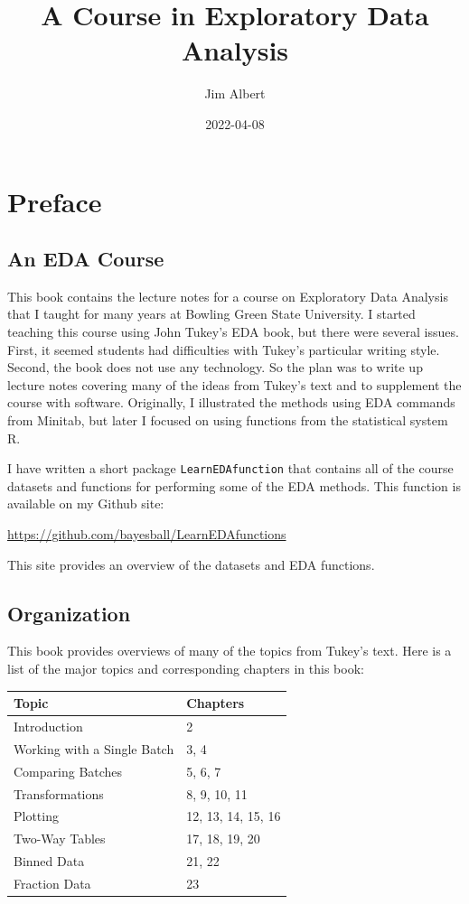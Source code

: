 \documentclass[
]{book}
\title{A Course in Exploratory Data Analysis}
\author{Jim Albert}
\date{2022-04-08}
\begin{document}
\maketitle

{
\setcounter{tocdepth}{1}
\tableofcontents
}
\hypertarget{preface}{%
\chapter{Preface}\label{preface}}

\hypertarget{an-eda-course}{%
\section{An EDA Course}\label{an-eda-course}}

This book contains the lecture notes for a course on Exploratory Data Analysis that I taught for many years at Bowling Green State University. I started teaching this course using John Tukey's EDA book, but there were several issues. First, it seemed students had difficulties with Tukey's particular writing style. Second, the book does not use any technology. So the plan was to write up lecture notes covering many of the ideas from Tukey's text and to supplement the course with software. Originally, I illustrated the methods using EDA commands from Minitab, but later I focused on using functions from the statistical system R.

I have written a short package \texttt{LearnEDAfunction} that contains all of the course datasets and functions for performing some of the EDA methods. This function is available on my Github site:

\url{https://github.com/bayesball/LearnEDAfunctions}

This site provides an overview of the datasets and EDA functions.

\hypertarget{organization}{%
\section{Organization}\label{organization}}

This book provides overviews of many of the topics from Tukey's text. Here is a list of the major topics and corresponding chapters in this book:

\begin{longtable}[]{@{}ll@{}}
\toprule
Topic & Chapters \\
\midrule
\endhead
Introduction & 2 \\
Working with a Single Batch & 3, 4 \\
Comparing Batches & 5, 6, 7 \\
Transformations & 8, 9, 10, 11 \\
Plotting & 12, 13, 14, 15, 16 \\
Two-Way Tables & 17, 18, 19, 20 \\
Binned Data & 21, 22 \\
Fraction Data & 23 \\
\bottomrule
\end{longtable}
\end{document}
